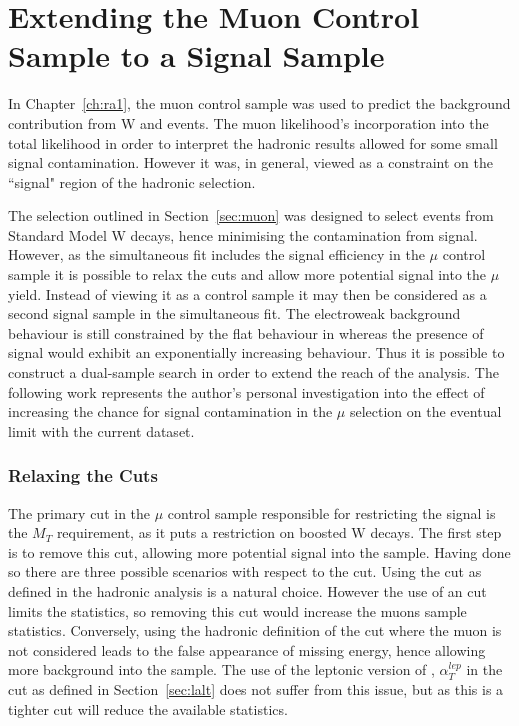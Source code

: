 \chapter{Extending the Muon Control Sample to a Signal Sample}
\label{ch:ra4}

In Chapter~\ref{ch:ra1}, the muon control sample was used to predict the background contribution from W and \tto events. The muon likelihood's incorporation into the total likelihood in order to interpret the hadronic results allowed for some small signal contamination. However it was, in general, viewed as a constraint on the ``signal" region of the hadronic selection. 

The selection outlined in Section~\ref{sec:muon} was designed to select events from Standard Model W decays, hence minimising the contamination from signal. However, as the simultaneous fit includes the signal efficiency in the $\mu$ control sample it is possible to relax the cuts and allow more potential signal into the $\mu$ yield. Instead of viewing it as a control sample it may then be considered as a second signal sample in the simultaneous fit. The electroweak background behaviour is still constrained by the flat behaviour in \RaT whereas the presence of signal would exhibit an exponentially increasing behaviour. Thus it is possible to construct a dual-sample search in order to extend the reach of the analysis.  The following work represents the author's personal investigation into the effect of increasing the chance for signal contamination in the $\mu$ selection on the eventual limit with the current dataset. 

\subsection{Relaxing the Cuts}

The primary cut in the $\mu$ control sample responsible for restricting the signal is the $M_{T}$ requirement, as it puts a restriction on boosted W decays. The first step is to remove this cut, allowing more potential signal into the sample. Having done so there are three possible scenarios with respect to the \alt cut. Using the \alt cut as defined in the hadronic analysis is a natural choice. However the use of an \alt cut limits the statistics, so removing this cut would increase the muons sample statistics. Conversely, using the hadronic definition of the \alt cut where the muon is not considered leads to the false appearance of missing energy, hence allowing more background into the sample. The use of the leptonic version of \alt, $\alpha^{lep}_{T}$ in the cut as defined in Section~\ref{sec:lalt} does not suffer from this issue, but as this is a tighter cut will reduce the available statistics. 


